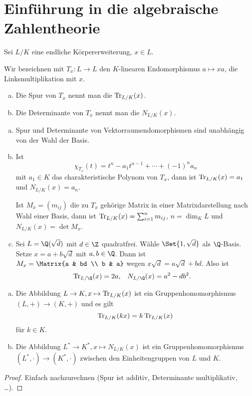 \chapter{Einführung in die algebraische Zahlentheorie}


\begin{df} \label{8.1}
	Sei $L / K$ eine endliche Körpererweiterung, $x \in L$.

	Wir bezeichnen mit $T_x: L \to L$ den $K$-linearen Endomorphismus $a \mapsto x a$, die Linksmultiplikation mit $x$.
	\begin{enumerate}[a)]
		\item
			Die Spur von $T_x$ nennt man die  $\operatorname{Tr}_{L/K}(x)$.
		\item
			Die Determinante von $T_x$ nennt man die  $N_{L/K}(x)$.
	\end{enumerate}
\end{df}

\begin{nt} \label{8.2}
	\begin{enumerate}[a)]
		\item
			Spur und Determinante von Vektorraumendomorphismen sind unabhängig von der Wahl der Basis.
		\item
			Ist
			\[
				\chi_{T_x}(t)
				= t^n - a_1 t^{n-1} + \dotsb + (-1)^n a_n
			\]
			mit $a_1 \in K$ das charakteristische Polynom von $T_x$, dann ist $\operatorname{Tr}_{L/K}(x) = a_1$ und $N_{L/K}(x) = a_n$.

			Ist $M_x = (m_{ij})$ die zu $T_x$ gehörige Matrix in einer Matrixdarstellung nach Wahl einer Basis, dann ist $\operatorname{Tr}_{L/K}(x) = \sum_{i=1}^n m_{ij}$, $n = \dim_K L$ und $N_{L/K}(x) = \det M_x$.
		\item
			Sei $L = \Q(\sqrt d)$ mit $d \in \Z$ quadratfrei.
			Wähle $\Set{1, \sqrt d}$ als $\Q$-Basis.
			Setze $x = a + b \sqrt d$ mit $a, b \in \Q$.
			Dann ist $M_x = \Matrix{a & bd \\ b & a}$ wegen $x \sqrt d = a \sqrt d + b d$.
			Also ist
			\begin{align*}
				\Tr_{L/\Q}(x) &= 2a, &
				N_{L/\Q}(x) &= a^2 - db^2.
			\end{align*}
	\end{enumerate}
\end{nt}

\begin{lem} \label{8.3}
	\begin{enumerate}[a)]
		\item
			Die Abbildung $L \to K, x \mapsto \operatorname{Tr}_{L/K}(x)$ ist ein Gruppenhomomorphismus $(L, +) \to (K, +)$ und es gilt
			\[
				\operatorname{Tr}_{L/K}(kx) = k \operatorname{Tr}_{L/K}(x)
			\]
			für $k \in K$.
		\item
			Die Abbildung $L^* \to K^*, x \mapsto N_{L/K}(x)$ ist ein Gruppenhomomorphismus $(L^*, \cdot) \to (K^*, \cdot)$ zwischen den Einheitengruppen von $L$ und $K$.
	\end{enumerate}
	\begin{proof}
		Einfach nachzurechnen (Spur ist additiv, Determinante multiplikativ, \dots).
	\end{proof}
\end{lem}

